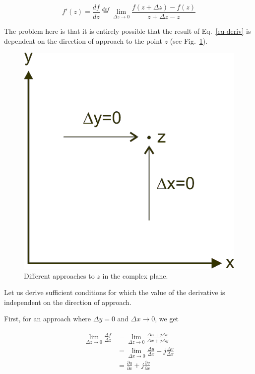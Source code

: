 \begin{equation}
f' (z)=\frac{df}{dz}  \stackrel{def}{=} \lim_{\Delta z \to 0} \frac{f(z+\Delta
z) - f(z)}{z+\Delta z - z} \label{eq-deriv}
\end{equation} 

The problem here is that it is entirely possible that the result of
Eq.~\ref{eq-deriv} is dependent on the direction of approach to the point $z$
(see Fig.~\ref{fig-approach-z}).

\begin{figure}
\centering
\includegraphics{complex/figures/approach_z}
\caption{Different approaches to $z$ in the complex plane.}
\label{fig-approach-z}
\end{figure}

Let us derive sufficient conditions for which the value of the derivative is
independent on the direction of approach.

First, for an approach where $\Delta y = 0$ and $\Delta x \to 0$, we get

\begin{align}
\lim_{\Delta z \to 0} \frac{\Delta f}{\Delta z}
& = \lim_{\Delta z \to 0} \frac{\Delta u + j \Delta v}{\Delta x + j \Delta y}
\nonumber \\
& = \lim_{\Delta x \to 0} \frac{\Delta u}{\Delta x} + j \frac{\Delta v}{\Delta
x} \nonumber \\
& = \frac{\partial u}{\partial x} + j \frac{\partial v}{\partial
x}\label{eq-deriv-dx}
\end{align} 

